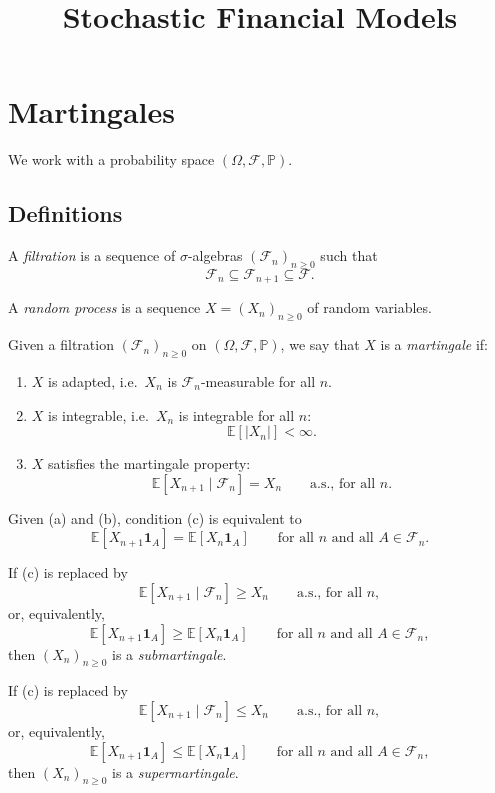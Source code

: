 \documentclass[11pt,a4paper]{article}
\title{Stochastic Financial Models}
\begin{document}
\maketitle
\thispagestyle{empty}
\section{Martingales}

We work with a probability space $(\Omega,\mathcal{F},\mathbb{P})$.

\subsection{Definitions}

A \emph{filtration} is a sequence of $\sigma$-algebras
$(\mathcal{F}_n)_{n\geq0}$ such that
\[
\mathcal{F}_n\subseteq\mathcal{F}_{n+1}\subseteq\mathcal{F}.
\]

A \emph{random process} is a sequence
$X=(X_n)_{n\geq0}$ of random variables.

Given a filtration $(\mathcal{F}_n)_{n\geq0}$ on
$(\Omega,\mathcal{F},\mathbb{P})$, we say that $X$ is a
\emph{martingale} if:
\begin{enumerate}
    \item[(a)] $X$ is adapted, i.e.\ $X_n$ is
    $\mathcal{F}_n$-measurable for all $n$.

    \item[(b)] $X$ is integrable, i.e.\ $X_n$ is integrable
    for all $n$:
    \[
    \mathbb{E}[|X_n|]<\infty.
    \]

    \item[(c)] $X$ satisfies the martingale property:
    \[
    \mathbb{E}[X_{n+1}\mid\mathcal{F}_n]
    =
    X_n
    \qquad\text{a.s., for all }n.
    \]
\end{enumerate}

Given (a) and (b), condition (c) is equivalent to
\[
\mathbb{E}[X_{n+1}\mathbf{1}_A]
=
\mathbb{E}[X_n\mathbf{1}_A]
\qquad
\text{for all }n
\text{ and all }A\in\mathcal{F}_n.
\]

If (c) is replaced by
\[
\mathbb{E}[X_{n+1}\mid\mathcal{F}_n]
\geq X_n
\qquad\text{a.s., for all }n,
\]
or, equivalently,
\[
\mathbb{E}[X_{n+1}\mathbf{1}_A]
\geq
\mathbb{E}[X_n\mathbf{1}_A]
\qquad
\text{for all }n
\text{ and all }A\in\mathcal{F}_n,
\]
then $(X_n)_{n\geq0}$ is a \emph{submartingale}.

If (c) is replaced by
\[
\mathbb{E}[X_{n+1}\mid\mathcal{F}_n]
\leq X_n
\qquad\text{a.s., for all }n,
\]
or, equivalently,
\[
\mathbb{E}[X_{n+1}\mathbf{1}_A]
\leq
\mathbb{E}[X_n\mathbf{1}_A]
\qquad
\text{for all }n
\text{ and all }A\in\mathcal{F}_n,
\]
then $(X_n)_{n\geq0}$ is a \emph{supermartingale}.
\end{document}

